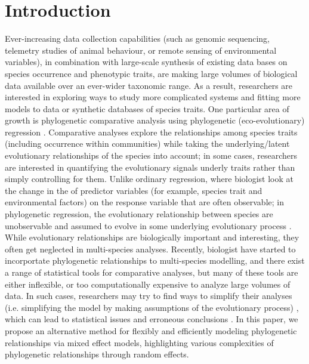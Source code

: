\section{Introduction}

Ever-increasing data collection capabilities (such as genomic sequencing, telemetry studies of animal behaviour, or remote sensing of environmental variables), in combination with large-scale synthesis of existing data bases on species occurrence and phenotypic traits, are making large volumes of biological data available over an ever-wider taxonomic range.
As a result, researchers are interested in exploring ways to study more complicated systems and fitting more models to data or synthetic databases of species traits.
One particular area of growth is phylogenetic comparative analysis using phylogenetic (eco-evolutionary) regression \cite{hansen2012interpreting}. 
Comparative analyses explore the relationships among species traits (including occurrence within communities) while taking the underlying/latent evolutionary relationships of the species into account; in some cases, researchers are interested in quantifying the evolutionary signals underly traits rather than simply controlling for them.
Unlike ordinary regression, where biologist look at the change in the of predictor variables (for example, species trait and environmental factors) on the response variable that are often observable; in phylogenetic regression, the evolutionary relationship between species are unobservable and assumed to evolve in some underlying evolutionary process \citep{felsenstein1985phylogenies, butler2004phylogenetic}. 
While evolutionary relationships are biologically important and interesting, they often get neglected in multi-species analyses. 
Recently, biologist have started to incorportate phylogenetic relationships to multi-species modelling, and there exist a range of statistical tools for comparative analyses, but many of these tools are either inflexible, or too computationally expensive to analyze large volumes of data.
In such cases, researchers may try to find ways to simplify their analyses (i.e. simplifying the model by making assumptions of the evolutionary process) \citep{bunnefeld2012island, ord2010adaptation},
which can lead to statistical issues and erroneous conclusions
\cite{felsenstein1985phylogenies, li2017statistical}.
In this paper, we propose an alternative method for flexibly and efficiently modeling phylogenetic relationships via mixed effect models, highlighting various complexities of phylogenetic relationships through random effects.

